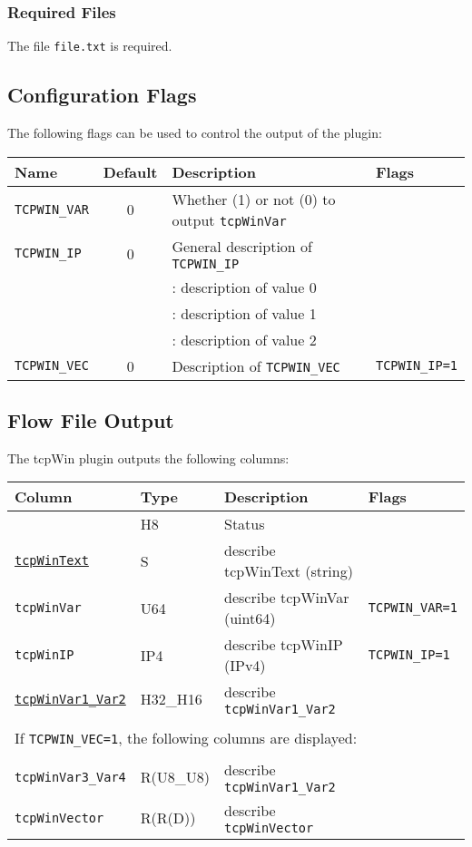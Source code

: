 \documentclass[documentation]{subfiles}
\begin{document}
\subsubsection{Required Files}
The file {\tt file.txt} is required.

\subsection{Configuration Flags}
The following flags can be used to control the output of the plugin:
\begin{longtable}{lcll}
    \toprule
    {\bf Name} & {\bf Default} & {\bf Description} & {\bf Flags}\\
    \midrule\endhead%
    {\tt TCPWIN\_VAR}   & 0 & Whether (1) or not (0) to output {\tt tcpWinVar}\\
    {\tt TCPWIN\_IP}    & 0 & General description of {\tt TCPWIN\_IP}\\
                        &   & \qquad 0: description of value 0\\
                        &   & \qquad 1: description of value 1\\
                        &   & \qquad 2: description of value 2\\
    {\tt TCPWIN\_VEC}   & 0 & Description of {\tt TCPWIN\_VEC} & {\tt\small TCPWIN\_IP=1}\\ %
    \bottomrule
\end{longtable}

\subsection{Flow File Output}
The tcpWin plugin outputs the following columns:
\begin{longtable}{llll}
    \toprule
    {\bf Column} & {\bf Type} & {\bf Description} & {\bf Flags}\\
    \midrule\endhead%
    {\tt \nameref{tcpWinStat}}              & H8 & Status                       & \\
    {\tt \hyperref[tcpWinStat]{tcpWinText}} & S  & describe tcpWinText (string) & \\

    {\tt tcpWinVar} & U64 & describe tcpWinVar (uint64) & {\tt\small TCPWIN\_VAR=1}\\  %
    {\tt tcpWinIP}  & IP4 & describe tcpWinIP (IPv4)    & {\tt\small TCPWIN\_IP=1} \\  %
    {\tt \hyperref[tcpWinVar1]{tcpWinVar1\_Var2}} & H32\_H16 & describe {\tt tcpWinVar1\_Var2} & \\
    \\
    \multicolumn{4}{l}{If {\tt TCPWIN\_VEC=1}, the following columns are displayed:}\\
    \\
    {\tt tcpWinVar3\_Var4} & R(U8\_U8) & describe {\tt tcpWinVar1\_Var2} & \\
    {\tt tcpWinVector}     & R(R(D))   & describe {\tt tcpWinVector}     & \\
    \bottomrule
\end{longtable}
\end{document}
